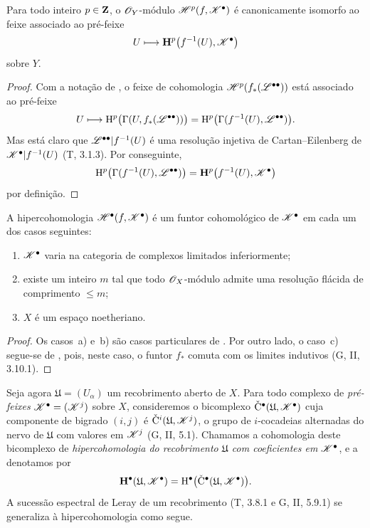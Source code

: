 \begin{proposition}[12.4.3]
\label{0.12.4.3}
Para todo inteiro $p\in\mathbf{Z}$, o $\mathscr{O}_Y$-módulo
$\mathscr{H}^p(f,\mathscr{K}^\bullet)$ é canonicamente isomorfo ao feixe
associado ao pré-feixe
\[
  U\longmapsto
  \mathbf{H}^p\bigl(f^{-1}(U),\mathscr{K}^\bullet\bigr)
\]
sobre $Y$.
\end{proposition}

\begin{proof}
Com a notação de , o feixe de cohomologia
$\mathscr{H}^p(f_*(\mathscr{L}^{\bullet\bullet}))$ está associado ao
pré-feixe
\[
  U\longmapsto
  \mathrm{H}^p\bigl(\Gamma(U,f_*(\mathscr{L}^{\bullet\bullet}))\bigr)
  =
  \mathrm{H}^p\bigl(\Gamma(f^{-1}(U),\mathscr{L}^{\bullet\bullet})\bigr).
\]
Mas está claro que
$\mathscr{L}^{\bullet\bullet}|f^{-1}(U)$ é uma resolução injetiva de
Cartan--Eilenberg de $\mathscr{K}^\bullet|f^{-1}(U)$ (T, 3.1.3).
Por conseguinte,
\[
  \mathrm{H}^p\bigl(\Gamma(f^{-1}(U),\mathscr{L}^{\bullet\bullet})\bigr)
  =
  \mathbf{H}^p\bigl(f^{-1}(U),\mathscr{K}^\bullet\bigr)
\]
por definição.
\end{proof}

\begin{proposition}[12.4.4]
\label{0.12.4.4}
A hipercohomologia $\mathscr{H}^\bullet(f,\mathscr{K}^\bullet)$ é um
funtor cohomológico de $\mathscr{K}^\bullet$ em cada um dos casos
seguintes:
\begin{enumerate}
  \item[\rm{a)}] $\mathscr{K}^\bullet$ varia na categoria de complexos
    limitados inferiormente;
  \item[\rm{b)}] existe um inteiro $m$ tal que todo
    $\mathscr{O}_X$-módulo admite uma resolução flácida de comprimento $\leq m$;
  \item[\rm{c)}] $X$ é um espaço noetheriano.
\end{enumerate}
\end{proposition}

\begin{proof}
Os casos~a) e~b) são casos particulares de .
Por outro lado, o caso~c) segue-se de , pois, neste
caso, o funtor $f_*$ comuta com os limites indutivos
(G, II, 3.10.1).
\end{proof}

\begin{env}[12.4.5]
\label{0.12.4.5}
Seja agora $\mathfrak{U}=(U_\alpha)$ um recobrimento aberto de $X$.
Para todo complexo de \emph{pré-feixes}
$\mathscr{K}^\bullet=(\mathscr{K}^j)$ sobre $X$, consideremos o bicomplexo
$\check{\mathrm{C}}^\bullet(\mathfrak{U},\mathscr{K}^\bullet)$ cuja
componente de bigrado $(i,j)$ é
$\check{\mathrm{C}}^i(\mathfrak{U},\mathscr{K}^j)$, o grupo de
$i$-cocadeias alternadas do nervo de $\mathfrak{U}$ com valores
em $\mathscr{K}^j$ (G, II, 5.1).
Chamamos a cohomologia deste bicomplexo de
\emph{hipercohomologia do recobrimento $\mathfrak{U}$ com
coeficientes em $\mathscr{K}^\bullet$}, e a denotamos por
\[
  \mathbf{H}^\bullet(\mathfrak{U},\mathscr{K}^\bullet)
  =
  \mathrm{H}^\bullet
  \bigl(\check{\mathrm{C}}^\bullet
    (\mathfrak{U},\mathscr{K}^\bullet)\bigr).
\]
A sucessão espectral de Leray de um recobrimento
(T, 3.8.1 e G, II, 5.9.1) se generaliza à hipercohomologia como segue.
\end{env}

